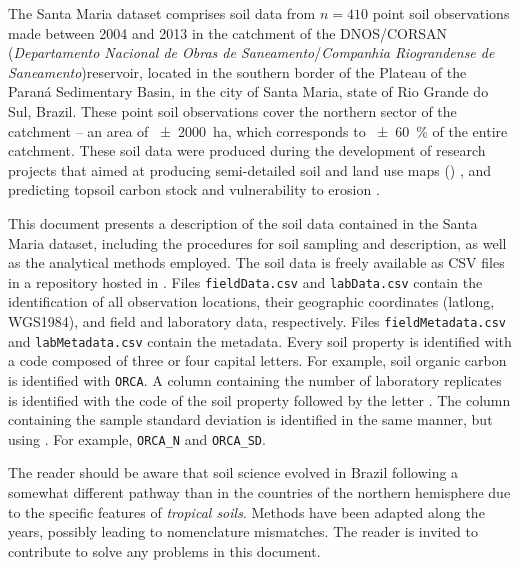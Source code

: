 
The Santa Maria dataset comprises soil data from $n = 410$ point soil observations made between 
\num{2004} and \num{2013} in the catchment of the DNOS/CORSAN (\textit{Departamento Nacional de Obras de 
Saneamento}/\textit{Companhia Riograndense de Saneamento})reservoir, located in the southern border of the 
Plateau of the Paraná Sedimentary Basin, in the city of Santa Maria, state of Rio Grande do Sul, Brazil. These 
point soil observations cover the northern sector of the catchment -- an area of \SI{\pm2000}{\hectare}, which 
corresponds to \SI{\pm60}{\percent} of the entire catchment. These soil data were produced during the 
development of research projects that aimed at producing semi-detailed soil and land use maps () 
\cite{Pedron2005, Miguel2010, SamuelRosaEtAl2011a, MiguelEtAl2012}, and predicting topsoil carbon stock and 
vulnerability to erosion \cite{Samuel-Rosa2009, MouraBueno2012, Miguel2013}.

This document presents a description of the soil data contained in the Santa Maria dataset, including the 
procedures for soil sampling and description, as well as the analytical methods employed. The soil data is 
freely available as CSV files in a repository hosted in \dnosgeneral{}. Files \texttt{fieldData.csv} and 
\texttt{labData.csv} contain the identification of all observation locations, their geographic coordinates 
(latlong, WGS1984), and field and laboratory data, respectively. Files \texttt{fieldMetadata.csv} and 
\texttt{labMetadata.csv} contain the metadata. Every soil property is identified with a code composed of three 
or four capital letters. For example, soil organic carbon is identified with \texttt{ORCA}. A column 
containing 
the number of laboratory replicates is identified with the code of the soil property followed by the letter 
. The column containing the sample standard deviation is identified in the same manner, but using . 
For example, \texttt{ORCA\_N} and \texttt{ORCA\_SD}.

The reader should be aware that soil science evolved in Brazil following a somewhat different pathway than in 
the countries of the northern hemisphere due to the specific features of \emph{tropical soils}. Methods have 
been adapted along the years, possibly leading to nomenclature mismatches. The reader is invited to contribute 
to solve any problems in this document.

